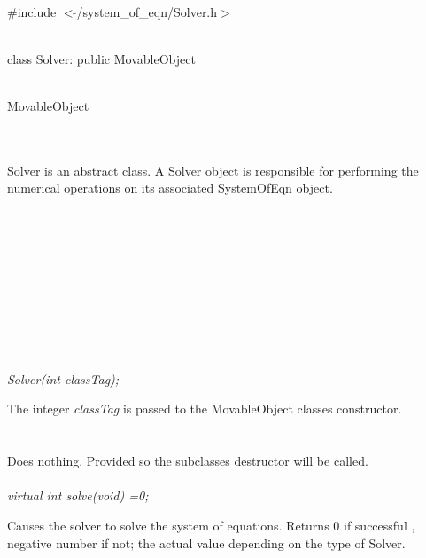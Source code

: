
   \\
\#include $<\tilde{ }$/system\_of\_eqn/Solver.h$>$  


  \\
class Solver:  public MovableObject 


 \\
MovableObject 

\indent{} \\

  \\
\indent Solver is an abstract class. A Solver object is responsible for performing
the numerical operations on its associated SystemOfEqn object. \\

 \\
\indent{}  \\ 
\indent{}  \\ \\
\indent{}  \\ 
\indent{}\\  \\
\indent{}  \\ 
\indent{} \\


  \\
{\em Solver(int classTag);}  

The integer {\em classTag} is passed to the MovableObject classes
constructor. \\ 

 \\
\\ 
Does nothing. Provided so the subclasses destructor will be called. \\

  \\
{\em virtual int solve(void) =0;} 

Causes the solver to solve the system of equations. Returns $0$ if
successful , negative number if not; the actual value depending on
the type of Solver.\\





